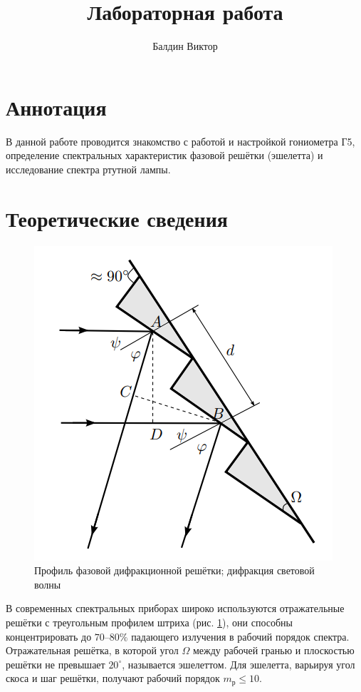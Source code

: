 \documentclass[a4paper]{article}
\title{Лабораторная работа \labnum \space \labname} %
\author{Балдин Виктор}
\begin{document}
\maketitle
\thispagestyle{empty}
\section{Аннотация}
В данной работе проводится  знакомство с работой и настройкой гониометра Г5, определение спектральных характеристик фазовой решётки (эшелетта) и исследование спектра ртутной лампы.

\section{Теоретические сведения}

\begin{figure}[tbp]
	\centering
	\includegraphics[width=0.8\linewidth]{Screenshot_2}
	\caption{Профиль фазовой дифракционной решётки; дифракция световой волны}
	\label{fig:решёткаВпрофиль}
\end{figure}

В современных спектральных приборах широко используются отражательные решётки с треугольным профилем штриха (рис. \ref{fig:решёткаВпрофиль}), они способны концентрировать до $ 70–80\% $ падающего излучения в рабочий порядок спектра. Отражательная решётка, в которой угол $ \Omega $ между рабочей гранью и плоскостью решётки не превышает $ 20^\circ $, называется эшелеттом. Для эшелетта, варьируя угол скоса и шаг решётки, получают рабочий порядок $ m_р \le 10 $.
\end{document}
